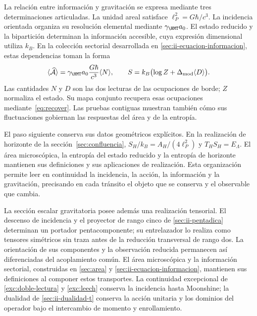La relación entre información y gravitación se expresa mediante tres
determinaciones articuladas. La unidad areal satisface
$\ell_P^2=G\hbar/c^3$. La incidencia orientada organiza su resolución
elemental mediante $\gamma_{\HMT}a_0$. El estado reducido y la bipartición
determinan la información accesible, cuya expresión dimensional utiliza
$k_B$. En la colección sectorial desarrollada en
\ref{sec:ii-ecuacion-informacion}, estas dependencias toman la forma
\begin{equation}
 \langle\widehat{\mathcal A}\rangle
 =\gamma_{\HMT}a_0\frac{G\hbar}{c^3}\langle N\rangle,
 \qquad
 S=k_B\bigl(\log Z+\Delta_{\rm mod}\langle D\rangle\bigr).
 \label{eq:ii-intro-area-informacion}
\end{equation}
Las cantidades $N$ y $D$ son las dos lecturas de las ocupaciones de
borde; $Z$ normaliza el estado. Su mapa conjunto recupera esas
ocupaciones mediante~\eqref{eq:recover}. Las pruebas contiguas muestran
también cómo sus fluctuaciones gobiernan las respuestas del área y de
la entropía.

El paso siguiente conserva sus datos geométricos explícitos. En la
realización de horizonte de la sección~\ref{sec:confluencia},
$S_H/k_B=A_H/(4\ell_P^2)$ y $T_HS_H=E_\Lambda$.
El área microscópica, la entropía del estado reducido y la entropía
de horizonte mantienen sus definiciones y sus aplicaciones de realización.
Esta organización permite leer en continuidad la incidencia, la acción,
la información y la gravitación, precisando en cada tránsito el objeto
que se conserva y el observable que cambia.

La sección escalar gravitatoria posee además una realización tensorial.
El descenso de incidencia y el proyector de rango cinco de
\ref{sec:ii-pentadica} determinan un portador pentacomponente;
su entrelazador lo realiza como tensores simétricos sin traza antes de
la reducción transversal de rango dos. La orientación de sus componentes
y la observación reducida permanecen así diferenciadas del acoplamiento
común. El área microscópica y la información sectorial, construidas en
\ref{sec:area} y \ref{sec:ii-ecuacion-informacion}, mantienen sus
definiciones al componer estos transportes. La continuidad excepcional
de \ref{exc:doble-lectura} y \ref{exc:leech} conserva la incidencia
hasta Moonshine; la dualidad de \ref{sec:ii-dualidad-t} conserva la
acción unitaria y los dominios del operador bajo el intercambio de
momento y enrollamiento.
